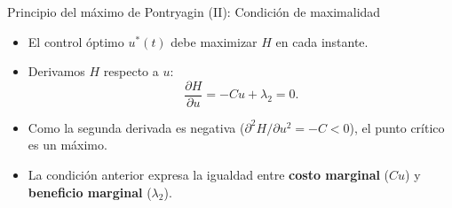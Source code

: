 \documentclass[10pt, aspectratio=169]{beamer}
\newcommand{\tb}{\textbf}
\begin{document}
\begin{frame}{Principio del máximo de Pontryagin (II): Condición de maximalidad}
\begin{itemize}
    \item El control óptimo $u^*(t)$ debe maximizar $H$ en cada instante.
    \item Derivamos $H$ respecto a $u$:
          \[
          \frac{\partial H}{\partial u} = -C u + \lambda_2 = 0.
          \]
    \item Como la segunda derivada es negativa ($\partial^2 H / \partial u^2 = -C < 0$), 
          el punto crítico es un máximo.
    \item La condición anterior expresa la igualdad entre 
          \tb{costo marginal} ($C u$) y \tb{beneficio marginal} ($\lambda_2$).
\end{itemize}
\end{frame}
\end{document}
